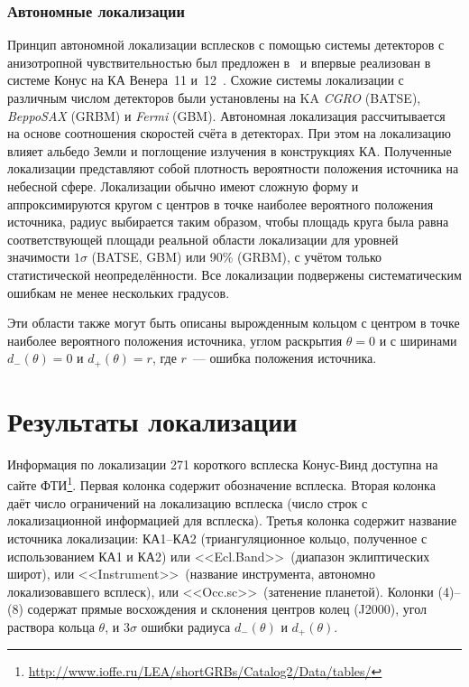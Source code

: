 \subsubsection{Автономные локализации}
Принцип автономной локализации всплесков с помощью системы детекторов с анизотропной 
чувствительностью был предложен в~\citep{Golenetskii_1974CosRe} и впервые реализован 
в системе Конус на КА Венера~11 и~12~\citep{Mazets_1981ApSS}. Схожие системы локализации 
с различным числом детекторов были установлены на KA \textit{CGRO} (BATSE), 
\textit{BeppoSAX} (GRBM) и \textit{Fermi} (GBM). Автономная локализация рассчитывается 
на основе соотношения скоростей счёта в детекторах. При этом на локализацию влияет 
альбедо Земли и поглощение излучения в конструкциях КА. Полученные локализации 
представляют собой плотность вероятности положения источника на небесной сфере. 
Локализации обычно имеют сложную форму и аппроксимируются кругом с центров в точке 
наиболее вероятного положения источника, радиус выбирается таким образом, 
чтобы площадь круга была равна соответствующей площади реальной области локализации 
для уровней значимости $1\sigma$ (BATSE, GBM) или 90\% (GRBM), с учётом только 
статистической неопределённости. Все локализации подвержены систематическим ошибкам 
не менее нескольких градусов.

Эти области также могут быть описаны вырожденным кольцом с центром в точке
наиболее вероятного положения источника, углом раскрытия $\theta =0$ и с ширинами 
$d_{-}(\theta) = 0$ и $d_{+}(\theta)= r$, где $r$~--- ошибка положения источника.

\section{Результаты локализации}
Информация по локализации 271 короткого всплеска Конус-Винд доступна на сайте 
ФТИ\footnote{\url{http://www.ioffe.ru/LEA/shortGRBs/Catalog2/Data/tables/}}.
Первая колонка содержит обозначение всплеска. Вторая колонка даёт 
число ограничений на локализацию всплеска (число строк с локализационной информацией 
для всплеска). Третья колонка содержит название источника локализации: 
КА1–КА2 (триангуляционное кольцо, полученное с использованием КА1 и КА2) или 
<<Ecl.Band>>\ (диапазон эклиптических широт), или <<Instrument>>\ (название инструмента, 
автономно локализовавшего всплеск), или <<Occ.sc>>\ (затенение планетой). 
Колонки (4)--(8) содержат прямые восхождения и склонения центров колец (J2000), 
угол раствора кольца $\theta$, и $3\sigma$ ошибки радиуса $d_{-}(\theta)$ и $d_{+}(\theta)$.

